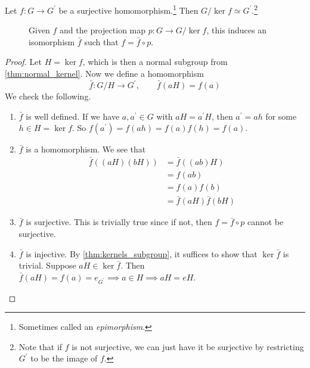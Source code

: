   \begin{theorem}
    \label{thm:fundamental-group-homomorphism-theorem}
    Let $f: G \to G^\prime$ be a surjective homomorphism.\footnote{Sometimes called an \textit{epimorphism}.} Then $G/{\ker{f}} \simeq G^\prime$.\footnote{Note that if $f$ is not surjective, we can just have it be surjective by restricting $G^\prime$ to be the image of $f$. }

    \begin{figure}[H]
      \centering 
      \caption{Given $f$ and the projection map $p: G \to G/{\ker{f}}$, this induces an isomorphism $\bar{f}$ such that $f = \bar{f} \circ p$.} 
      \label{fig:group_fund_homo_theorem}
    \end{figure}
  \end{theorem}
  \begin{proof}
    Let $H = \ker{f}$, which is then a normal subgroup from \ref{thm:normal_kernel}. Now we define a homomorphism 
    \begin{equation}
      \bar{f}: G/H \to G^\prime, \qquad \bar{f}(aH) = f(a)
    \end{equation}
    We check the following. 
    \begin{enumerate}
      \item $\bar{f}$ is well defined. If we have $a, a^\prime \in G$ with $aH = a^\prime H$, then $a^\prime = a h$ for some $h \in H = \ker{f}$. So $f(a^\prime) = f(ah) = f(a) f(h) = f(a)$. 

      \item $\bar{f}$ is a homomorphism. We see that 
      \begin{align}
        \bar{f}((aH)(bH)) & = \bar{f}((ab)H) \\ 
                          & = f(ab) \\
                          & = f(a) f(b) \\  
                          & = \bar{f}(aH) \bar{f}(bH) 
      \end{align}

      \item $\bar{f}$ is surjective. This is trivially true since if not, then $f = \bar{f} \circ p$ cannot be surjective. 

      \item $\bar{f}$ is injective. By \ref{thm:kernels_subgroup}, it suffices to show that $\ker{\bar{f}}$ is trivial. Suppose $aH \in \ker{\bar{f}}$. Then $\bar{f}(aH) = f(a) = e_{G^\prime} \implies a \in H \implies aH = eH$. 
    \end{enumerate}
  \end{proof}

